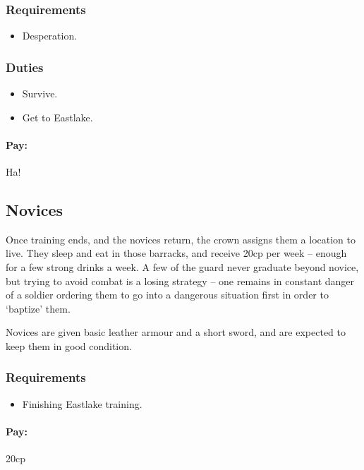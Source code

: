 \begin{multicols}{2}
\subsubsection{Requirements}

\begin{itemize}
  \item
  Desperation.
\end{itemize}

\subsubsection{Duties}

\begin{itemize}
  \item
  Survive.
  \item
  Get to Eastlake.
\end{itemize}

\paragraph{Pay:} Ha!

\subsection{Novices}

Once training ends, and the novices return, the crown assigns them a location to live.
They sleep and eat in those barracks, and receive 20cp per week -- enough for a few strong drinks a week.
A few of the \gls{guard} never graduate beyond novice, but trying to avoid combat is a losing strategy -- one remains in constant danger of a soldier ordering them to go into a dangerous situation first in order to `baptize' them.

Novices are given basic leather armour and a short sword, and are expected to keep them in good condition.

\subsubsection{Requirements}

\begin{itemize}
  \item
  Finishing Eastlake training.
\end{itemize}

\paragraph{Pay:} 20cp


\end{multicols}
